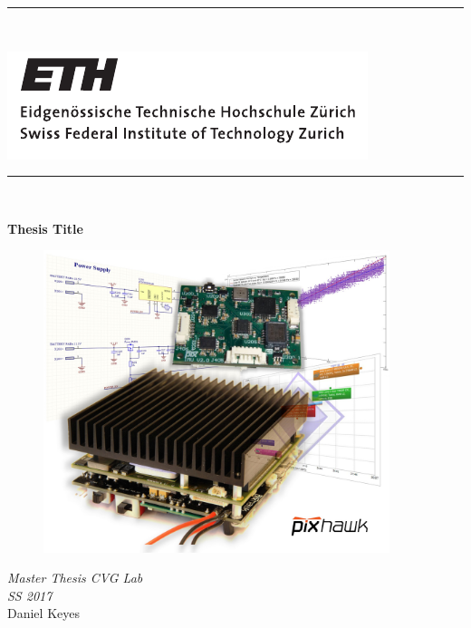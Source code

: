 \thispagestyle{empty}
\enlargethispage{2cm} 

\begin{center}
		\vspace*{-3.3cm}
    \rule{\linewidth}{0.5pt} \\
\end{center}

\includegraphics[width=.4\textwidth]{ethlogo}
\vspace{-1.2cm} 

\begin{center}
		\vspace*{0.4cm}
    \rule{\linewidth}{0.5pt} \\
\end{center}


\begin{center}
  \vspace*{.8cm}
  \LARGE \bfseries \boldmath
 Thesis Title
  \vspace*{0.5cm} \unboldmath
\end{center}


\begin{figure}[htb!]
	\centering
  \includegraphics[width=0.9\textwidth]{titlepageimage.jpg}\\
\end{figure}

\begin{center}
  \vspace*{0.5cm}
  \Large
  \textit{Master Thesis CVG Lab\\SS 2017} \\
  \vspace{1cm}
  \Large \mdseries
  Daniel Keyes\\
  \vspace{0.5cm}
\end{center}

